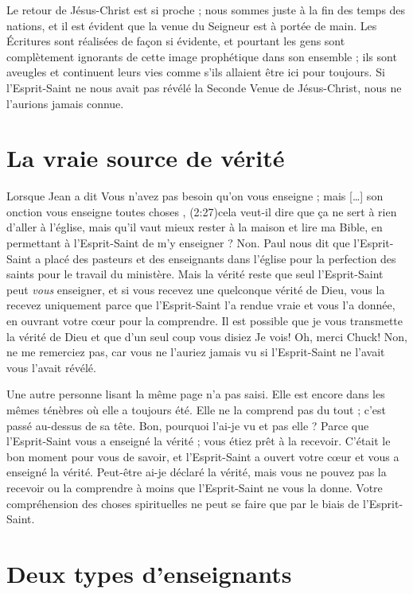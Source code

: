 Le retour de Jésus-Christ est si proche ; nous sommes juste à la fin
 des temps des nations, et il est évident que la venue du Seigneur
 est à portée de main. Les Écritures sont réalisées de façon si évidente,
 et pourtant les gens sont complètement ignorants de cette image prophétique
 dans son ensemble ; ils sont aveugles et continuent leurs vies
 comme s'ils allaient être ici pour toujours.
 Si l'Esprit-Saint ne nous avait pas révélé la Seconde Venue de Jésus-Christ,
 nous ne l'aurions jamais connue.


\section{La vraie source de v\'erit\'e}

Lorsque Jean a dit\frcolon{}
 \Og Vous n'avez pas besoin qu'on vous enseigne ;
 mais [\dots{}] son onction vous enseigne toutes choses \Fg{},
 (2:27)cela veut-il dire que ça ne sert à rien
 d'aller à l'église,
 mais qu'il vaut mieux rester à la maison et lire ma Bible,
 en permettant à l'Esprit-Saint de m'y enseigner ? Non.
 Paul nous dit que l'Esprit-Saint a placé des pasteurs
 et des enseignants dans l'église pour la perfection des saints
 pour le travail du ministère.
 Mais la vérité reste que seul l'Esprit-Saint peut \emph{vous} enseigner,
 et si vous recevez une quelconque vérité de Dieu,
 vous la recevez uniquement parce que l'Esprit-Saint
 l'a rendue vraie et vous l'a donnée, en ouvrant votre cœur
 pour la comprendre.
 Il est possible que je vous transmette la vérité de Dieu
 et que d'un seul coup vous disiez\frcolon{} \Og Je vois!
 Oh, merci Chuck! \Fg{} Non, ne me remerciez pas,
 car vous ne l'auriez jamais vu si l'Esprit-Saint
 ne l'avait vous l'avait révélé.
 \nowidow[4]


Une autre personne lisant la même page n'a pas saisi.
 Elle est encore dans les mêmes ténèbres où elle a toujours été.
 Elle ne la comprend pas du tout ; c'est passé au-dessus de sa tête.
 \Og Bon, pourquoi l'ai-je vu et pas elle ? \Fg{}
 Parce que l'Esprit-Saint vous a enseigné la vérité ;
 vous étiez prêt à la recevoir.
 C'était le bon moment pour vous de savoir, et l'Esprit-Saint
 a ouvert votre cœur et vous a enseigné la vérité.
 Peut-être ai-je déclaré la vérité, mais vous ne pouvez pas la recevoir
 ou la comprendre à moins que l'Esprit-Saint ne vous la donne.
 Votre compréhension des choses spirituelles ne peut se faire
 que par le biais de l'Esprit-Saint.


\section{Deux types d'enseignants}

